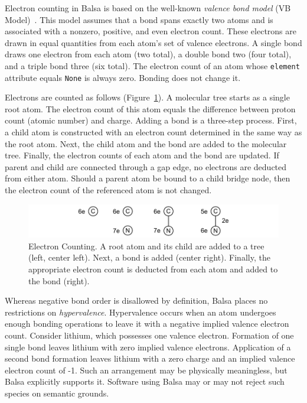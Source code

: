 \documentclass{article}
\def\ttt{\texttt}
\begin{document}
Electron counting in Balsa is based on the well-known \textit{valence bond model} (VB Model)~\cite{lewis:1916}. This model assumes that a bond spans exactly two atoms and is associated with a nonzero, positive, and even electron count. These electrons are drawn in equal quantities from each atom's set of valence electrons. A single bond draws one electron from each atom (two total), a double bond two (four total), and a triple bond three (six total). The electron count of an atom whose \ttt{element} attribute equals \ttt{None} is always zero. Bonding does not change it.

Electrons are counted as follows (Figure~\ref{fig:electron-counting}). A molecular tree starts as a single root atom. The electron count of this atom equals the difference between proton count (atomic number) and charge. Adding a bond is a three-step process. First, a child atom is constructed with an electron count determined in the same way as the root atom. Next, the child atom and the bond are added to the molecular tree. Finally, the electron counts of each atom and the bond are updated. If parent and child are connected through a gap edge, no electrons are deducted from either atom. Should a parent atom be bound to a child bridge node, then the electron count of the referenced atom is not changed.

\begin{figure}
    \centering
    \includegraphics[width=\columnwidth]{electron-counting.pdf}
    \caption{Electron Counting. A root atom and its child are added to a tree (left, center left). Next, a bond is added (center right). Finally, the appropriate electron count is deducted from each atom and added to the bond (right).}
    \label{fig:electron-counting}
\end{figure}

Whereas negative bond order is disallowed by definition, Balsa places no restrictions on \textit{hypervalence}. Hypervalence occurs when an atom undergoes enough bonding operations to leave it with a negative implied valence electron count. Consider lithium, which possesses one valence electron. Formation of one single bond leaves lithium with zero implied valence electrons. Application of a second bond formation leaves lithium with a zero charge and an implied valence electron count of -1. Such an arrangement may be physically meaningless, but Balsa explicitly supports it. Software using Balsa may or may not reject such species on semantic grounds.
\end{document}
